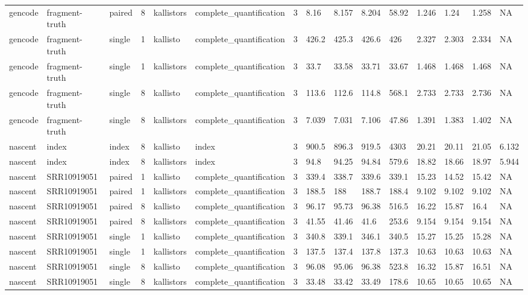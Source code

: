 \begin{tabular}{lllllllllllllll}
gencode & fragment-truth & paired & 8 & kallistors & complete\_quantification & 3 & 8.16 & 8.157 & 8.204 & 58.92 & 1.246 & 1.24 & 1.258 & NA \\
gencode & fragment-truth & single & 1 & kallisto & complete\_quantification & 3 & 426.2 & 425.3 & 426.6 & 426 & 2.327 & 2.303 & 2.334 & NA \\
gencode & fragment-truth & single & 1 & kallistors & complete\_quantification & 3 & 33.7 & 33.58 & 33.71 & 33.67 & 1.468 & 1.468 & 1.468 & NA \\
gencode & fragment-truth & single & 8 & kallisto & complete\_quantification & 3 & 113.6 & 112.6 & 114.8 & 568.1 & 2.733 & 2.733 & 2.736 & NA \\
gencode & fragment-truth & single & 8 & kallistors & complete\_quantification & 3 & 7.039 & 7.031 & 7.106 & 47.86 & 1.391 & 1.383 & 1.402 & NA \\
nascent & index & index & 8 & kallisto & index & 3 & 900.5 & 896.3 & 919.5 & 4303 & 20.21 & 20.11 & 21.05 & 6.132 \\
nascent & index & index & 8 & kallistors & index & 3 & 94.8 & 94.25 & 94.84 & 579.6 & 18.82 & 18.66 & 18.97 & 5.944 \\
nascent & SRR10919051 & paired & 1 & kallisto & complete\_quantification & 3 & 339.4 & 338.7 & 339.6 & 339.1 & 15.23 & 14.52 & 15.42 & NA \\
nascent & SRR10919051 & paired & 1 & kallistors & complete\_quantification & 3 & 188.5 & 188 & 188.7 & 188.4 & 9.102 & 9.102 & 9.102 & NA \\
nascent & SRR10919051 & paired & 8 & kallisto & complete\_quantification & 3 & 96.17 & 95.73 & 96.38 & 516.5 & 16.22 & 15.87 & 16.4 & NA \\
nascent & SRR10919051 & paired & 8 & kallistors & complete\_quantification & 3 & 41.55 & 41.46 & 41.6 & 253.6 & 9.154 & 9.154 & 9.154 & NA \\
nascent & SRR10919051 & single & 1 & kallisto & complete\_quantification & 3 & 340.8 & 339.1 & 346.1 & 340.5 & 15.27 & 15.25 & 15.28 & NA \\
nascent & SRR10919051 & single & 1 & kallistors & complete\_quantification & 3 & 137.5 & 137.4 & 137.8 & 137.3 & 10.63 & 10.63 & 10.63 & NA \\
nascent & SRR10919051 & single & 8 & kallisto & complete\_quantification & 3 & 96.08 & 95.06 & 96.38 & 523.8 & 16.32 & 15.87 & 16.51 & NA \\
nascent & SRR10919051 & single & 8 & kallistors & complete\_quantification & 3 & 33.48 & 33.42 & 33.49 & 178.6 & 10.65 & 10.65 & 10.65 & NA \\

\end{tabular}
